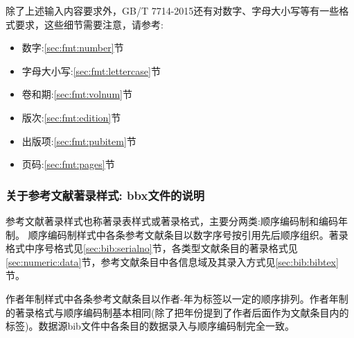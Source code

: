 除了上述输入内容要求外，GB/T 7714-2015还有对数字、字母大小写等有一些格式要求，这些细节需要注意，请参考:
\begin{itemize}
\item 数字:\ref{sec:fmt:number}节
\item 字母大小写:\ref{sec:fmt:lettercase}节
\item 卷和期:\ref{sec:fmt:volnum}节
\item 版次:\ref{sec:fmt:edition}节
\item 出版项:\ref{sec:fmt:pubitem}节
\item 页码:\ref{sec:fmt:pages}节
\end{itemize}



\subsubsection{关于参考文献著录样式: bbx文件的说明}\label{sec:usage:bbx}
参考文献著录样式也称著录表样式或著录格式，主要分两类:顺序编码制和编码年制。
顺序编码制样式中各条参考文献条目以数字序号按引用先后顺序组织。著录格式中序号格式见\ref{sec:bib:serialno}节，各类型文献条目的著录格式见\ref{sec:numeric:data}节，参考文献条目中各信息域及其录入方式见\ref{sec:bib:bibtex}节。

作者年制样式中各条参考文献条目以作者-年为标签以一定的顺序排列。作者年制的著录格式与顺序编码制基本相同(除了把年份提到了作者后面作为文献条目内的标签)。数据源bib文件中各条目的数据录入与顺序编码制完全一致。



